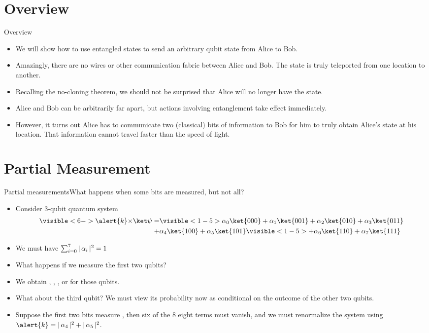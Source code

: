 
\section*{Overview}
\begin{frame}{Overview}
    \begin{itemize}[<+->]
        \item We will show how to use entangled states to send an arbitrary qubit state from Alice to Bob.
        \item Amazingly, there are no wires or other communication fabric between Alice and Bob.  The state is truly teleported from one location to another.
        \item Recalling the no-cloning theorem, we should not be surprised that Alice will no longer have the state.
        \item Alice and Bob can be arbitrarily far apart, but actions involving entanglement take effect immediately.
        \item However, it turns out Alice has to communicate two (classical) bits of information to Bob for him to truly obtain Alice's state at his location.  That information cannot travel faster than the speed of light.
    \end{itemize}
\end{frame}

\section*{Partial Measurement}

\begin{frame}{Partial measurements}{What happens when some bits are measured, but not all?}
\begin{itemize}[<+->]
    \item Consider 3-qubit quantum system
    \begin{align*}
  \visible<6->{\alert{k} \times }\QState{\relax}
   = & \visible<1-5>{\alpha_{0} \ket{000}
  +  \alpha_{1} \ket{001}
  +  \alpha_{2} \ket{010}
  +  \alpha_{3} \ket{011} }\\
  +  & \alpha_{4} \ket{100}
  +  \alpha_{5} \ket{101}
 \visible<1-5>{ +  \alpha_{6} \ket{110}
  +  \alpha_{7} \ket{111}}
    \end{align*}
    \item We must have $\sum_{i=0}^{7} |\,\alpha_{i}\,|^{2} = 1$
    \item What happens if we measure the first two qubits? 
    \item We obtain , , , or  for those qubits.
    \item What about the third qubit?  We must view its probability now as conditional on the outcome of the other two qubits.
    \item Suppose the first two bits measure , then six of the 8 eight terms must vanish, and we must renormalize the system using $\alert{k}=\Prob{\alpha_4} + \Prob{\alpha_5}$. 
\end{itemize}

    
\end{frame}

